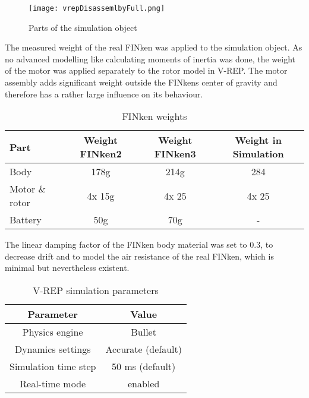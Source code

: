 \begin{figure}[h!]
 \begin{center}
  \texttt{[image: vrepDisassemlbyFull.png]}
 \end{center}
  \caption{Parts of the simulation object \label{fig:vrepParts}}
\end{figure}

The measured weight of the real FINken was applied to the simulation object. 
As no advanced modelling like calculating moments of inertia was done, the weight of the motor was applied separately to the rotor model in V-REP.  The motor assembly adds significant weight outside the FINkens center of gravity and therefore has a rather large influence on its behaviour. 

\begin{table}[h]
	\centering
	\begin{tabular}{|l|c|c|c|}
    		\hline
		Part & Weight FINken2 & Weight FINken3 & Weight in Simulation \\
		\hline
    		Body & 178g &  214g & 284\\
    		\hline
		Motor \& rotor & 4x 15g & 4x 25 & 4x 25\\
    		\hline
		Battery & 50g & 70g & - \\
    		\hline
	\end{tabular}
    	\caption{FINken weights}
      	\label{tab:finkWeight}
\end{table}

The linear damping factor of the FINken body material was set to 0.3, to decrease drift and to model the air resistance of the real FINken, which is minimal but nevertheless existent.

\begin{table}[h]
	\centering
	\begin{tabular}{|c|c|}
    		\hline
		Parameter & Value \\
		\hline
    		Physics engine & Bullet\\
    		\hline
    		Dynamics settings & Accurate (default) \\
    		\hline
    		Simulation time step & 50 ms (default) \\
    		\hline
    		Real-time mode & enabled \\
    		\hline
	\end{tabular}
    	\caption{V-REP simulation parameters}
      	\label{tab:simSettings}
\end{table}

